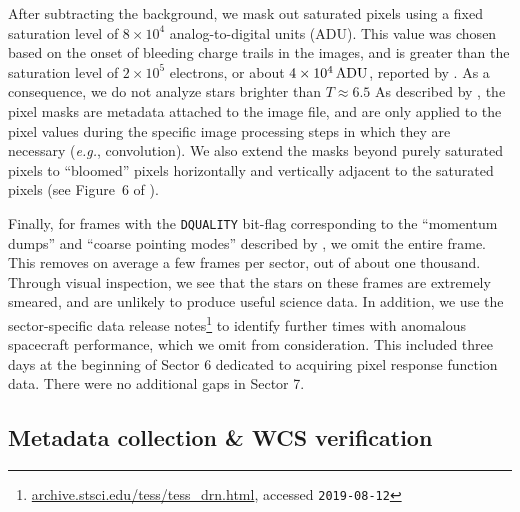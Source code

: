 \documentclass[12pt,twocolumn,tighten,trackchanges]{aastex62}
\begin{document}

After subtracting the background, we mask out saturated pixels using a
fixed saturation level of $8\times10^4$ analog-to-digital units (ADU).
This value was chosen based on the onset of bleeding charge trails in
the images, and is  greater than the 
saturation level of
$2\times10^5$ electrons, or about $4\times10^4\,{\rm ADU}$, reported
by \citet{vanderspek_2018}.  As a consequence, we do not analyze stars
brighter than $T\approx 6.5$
As described by \citet{Pal_2009}, the
pixel masks are metadata attached to the image file, and are only
applied to the pixel values during the specific image processing steps
in which they are necessary ({\it e.g.}, convolution). We also extend
the masks beyond purely saturated pixels to ``bloomed'' pixels
horizontally and vertically adjacent to the saturated pixels (see
Figure~6 of \citealt{Pal_2009}).

Finally, for frames with the \texttt{DQUALITY} bit-flag corresponding
to the ``momentum dumps'' and ``coarse pointing modes'' described by
\citet{vanderspek_2018}, we omit the entire frame.  This removes on
average a few frames per sector, out of about one thousand. Through
visual inspection, we see that the stars on these frames are extremely
smeared, and are unlikely to produce useful science data.  In
addition, we use the sector-specific data release notes\footnote{\url{
  archive.stsci.edu/tess/tess_drn.html}, accessed \texttt{2019-08-12}} to identify further times
with anomalous spacecraft performance, which we omit from
consideration.  This included three days at the beginning of Sector 6
dedicated to acquiring pixel response function data. There were no
additional gaps in Sector 7.

\subsection{Metadata collection \& WCS verification}
\label{subsec:metadatacollection}
\end{document}
